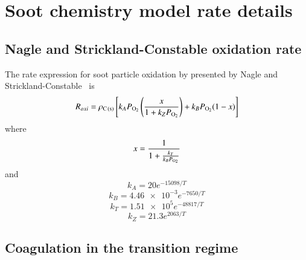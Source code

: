 \documentclass[preprint,letterpaper]{elsarticle}
\begin{document}

\appendix

\section{Soot chemistry model rate details}

\subsection{Nagle and Strickland-Constable oxidation rate}
\label{a:NSC}

The rate expression for soot particle oxidation by  presented by Nagle and Strickland-Constable~\cite{Nagle_1962} is
\begin{equation}
    R_{oxi} = \rho_{\ce{C(s)}} \left[ k_A P_{\ce{O2}} \left( \frac{x}{1+k_Z P_{\ce{O2}}}\right) + k_B P_{\ce{O2}} (1-x) \right]
\end{equation}
where
\begin{equation}
    x=\frac{1}{1+\frac{k_T}{k_B P_{\ce{O2}}}}
\end{equation}
and
\begin{equation}
    k_A = 20e^{-15098/T}
\end{equation}
\begin{equation}
    k_B = \num{4.46e-3}e^{-7650/T}
\end{equation}
\begin{equation}
    k_T = \num{1.51e5}e^{-48817/T}
\end{equation}
\begin{equation}
    k_Z = 21.3e^{2063/T}
\end{equation}

\subsection{Coagulation in the transition regime}
\label{a:coag}
\end{document}
